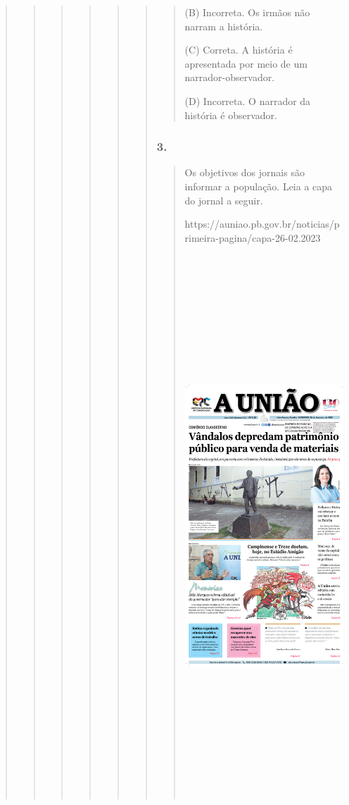 \begin{quote}
\begin{quote}
\begin{quote}
\begin{quote}
\begin{quote}
\begin{quote}
\begin{quote}
(B) Incorreta. Os irmãos não narram a história.

(C) Correta. A história é apresentada por meio de um
narrador-observador.

(D) Incorreta. O narrador da história é observador.
\end{quote}

\subsubsection{3. }\label{section-92}

\begin{quote}
Os objetivos dos jornais são informar a população. Leia a capa do jornal
a seguir.

https://auniao.pb.gov.br/noticias/primeira-pagina/capa-26-02.2023

\includegraphics[width=4.47917in,height=8.00000in]{media/image37.png}


\end{quote}
\end{quote}
\end{quote}
\end{quote}
\end{quote}
\end{quote}
\end{quote}
